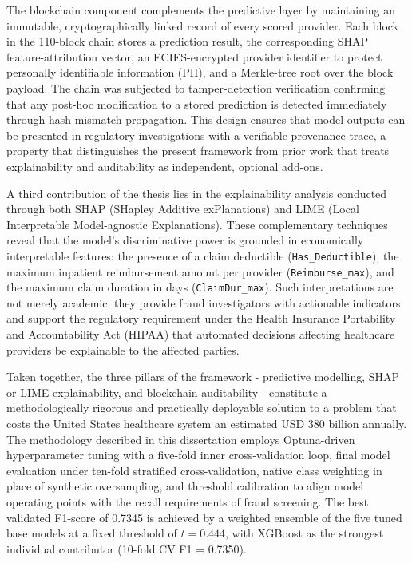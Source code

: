 The blockchain component complements the predictive layer by maintaining an immutable, cryptographically linked record of every scored provider. Each block in the 110-block chain stores a prediction result, the corresponding SHAP feature-attribution vector, an ECIES-encrypted provider identifier to protect personally identifiable information (PII), and a Merkle-tree root over the block payload. The chain was subjected to tamper-detection verification confirming that any post-hoc modification to a stored prediction is detected immediately through hash mismatch propagation. This design ensures that model outputs can be presented in regulatory investigations with a verifiable provenance trace, a property that distinguishes the present framework from prior work that treats explainability and auditability as independent, optional add-ons.

A third contribution of the thesis lies in the explainability analysis conducted through both SHAP (SHapley Additive exPlanations) and LIME (Local Interpretable Model-agnostic Explanations). These complementary techniques reveal that the model's discriminative power is grounded in economically interpretable features: the presence of a claim deductible (\texttt{Has\_Deductible}), the maximum inpatient reimbursement amount per provider (\texttt{Reimburse\_max}), and the maximum claim duration in days (\texttt{ClaimDur\_max}). Such interpretations are not merely academic; they provide fraud investigators with actionable indicators and support the regulatory requirement under the Health Insurance Portability and Accountability Act (HIPAA) that automated decisions affecting healthcare providers be explainable to the affected parties.

Taken together, the three pillars of the framework - predictive modelling, SHAP or LIME explainability, and blockchain auditability - constitute a methodologically rigorous and practically deployable solution to a problem that costs the United States healthcare system an estimated USD 380 billion annually. The methodology described in this dissertation employs Optuna-driven hyperparameter tuning with a five-fold inner cross-validation loop, final model evaluation under ten-fold stratified cross-validation, native class weighting in place of synthetic oversampling, and threshold calibration to align model operating points with the recall requirements of fraud screening. The best validated F1-score of 0.7345 is achieved by a weighted ensemble of the five tuned base models at a fixed threshold of $t=0.444$, with XGBoost as the strongest individual contributor (10-fold CV F1 = 0.7350).


